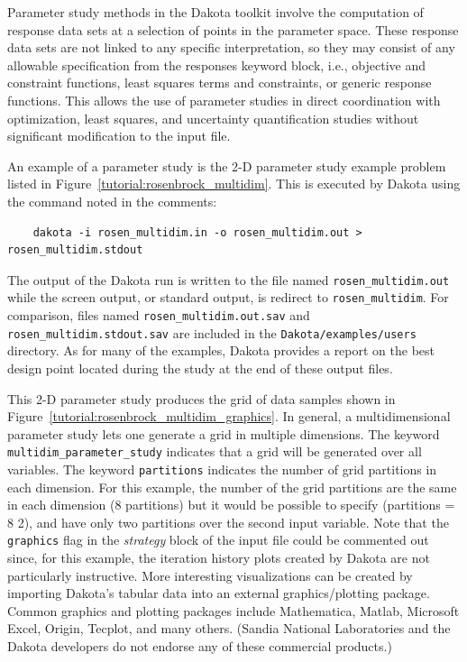 Parameter study methods in the Dakota toolkit involve the computation 
of response data sets at a selection of points in the parameter space. 
These response data sets are not linked to any specific interpretation,
so they may consist of any allowable specification from the responses 
keyword block, i.e., objective and constraint functions, least squares 
terms and constraints, or generic response functions. This allows the 
use of parameter studies in direct coordination with optimization, least 
squares, and uncertainty quantification studies without significant
modification to the input file. 

An example of a parameter study is the 2-D parameter study example problem 
listed in Figure~\ref{tutorial:rosenbrock_multidim}. This is 
executed by Dakota using the command noted in the comments:
\begin{small}
\begin{verbatim}
    dakota -i rosen_multidim.in -o rosen_multidim.out > rosen_multidim.stdout
\end{verbatim}
\end{small}

The output of the Dakota run is written to the file named
\texttt{rosen\_multidim.out} while the screen output, 
or standard output, is redirect to \texttt{rosen\_multidim}.
 For comparison, files named 
\texttt{rosen\_multidim.out.sav} and
\texttt{rosen\_multidim.stdout.sav} are
included in the \texttt{Dakota/examples/users} directory. As
for many of the examples, Dakota provides a report on the best design
point located during the study at the end of these output files.

This 2-D parameter study produces the grid of data samples shown in
Figure~\ref{tutorial:rosenbrock_multidim_graphics}. In general, a multidimensional 
parameter study lets one generate a grid in multiple dimensions. 
The keyword \texttt{multidim\_parameter\_study} indicates that 
a grid will be generated over all variables. The keyword 
\texttt{partitions} indicates the number of grid partitions in 
each dimension. For this example, the number of the grid partitions 
are the same in each dimension (8 partitions) but it would be possible 
to specify (partitions = 8 2), and have only two partitions 
over the second input variable.  Note that the
\texttt{graphics} flag in the \emph{strategy} block of the input
file could be commented out since, for this example, the iteration
history plots created by Dakota are not particularly instructive. More
interesting visualizations can be created by importing Dakota's
tabular data into an external graphics/plotting package. Common
graphics and plotting packages include Mathematica, Matlab, Microsoft
Excel, Origin, Tecplot, and many others. (Sandia National Laboratories
and the Dakota developers do not endorse any of these commercial
products.)

